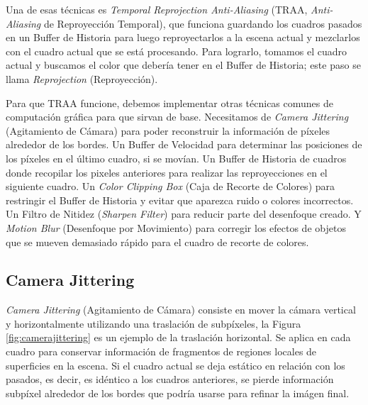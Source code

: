 \documentclass[pregrado]{tesis-usb} %
\begin{document}
Una de esas técnicas es \textit{Temporal Reprojection Anti-Aliasing}  (TRAA, \textit{Anti-Aliasing} de Reproyección Temporal), que funciona guardando los cuadros pasados en un Buffer de Historia para luego reproyectarlos a la escena actual y mezclarlos con el cuadro actual que se está procesando. Para lograrlo, tomamos el cuadro actual y buscamos el color que debería tener en el Buffer de Historia; este paso se llama \textit{Reprojection} (Reproyección).

Para que TRAA funcione, debemos implementar otras técnicas comunes de computación gráfica para que sirvan de base. Necesitamos de \textit{Camera Jittering} (Agitamiento de Cámara) para poder reconstruir la información de píxeles alrededor de los bordes. Un Buffer de Velocidad para determinar las posiciones de los píxeles en el último cuadro, si se movían. Un Buffer de Historia de cuadros donde recopilar los pixeles anteriores para realizar las reproyecciones en el siguiente cuadro. Un \textit{Color Clipping Box} (Caja de Recorte de Colores) para restringir el Buffer de Historia y evitar que aparezca ruido o colores incorrectos. Un Filtro de Nitidez (\textit{Sharpen Filter}) para reducir parte del desenfoque creado. Y \textit{Motion Blur} (Desenfoque por Movimiento) para corregir los efectos de objetos que se mueven demasiado rápido para el cuadro de recorte de colores.


\subsection{Camera Jittering}
\textit{Camera Jittering} (Agitamiento de Cámara) consiste en mover la cámara vertical y horizontalmente utilizando una traslación de subpíxeles, la Figura \ref{fig:camerajittering} es un ejemplo de la traslación horizontal. Se aplica en cada cuadro para conservar información de fragmentos de regiones locales de superficies en la escena. Si el cuadro actual se deja estático en relación con los pasados, es decir, es idéntico a los cuadros anteriores, se pierde información subpíxel alrededor de los bordes que podría usarse para refinar la imágen final.  ~\cite{Fuglsand2016, XU2016}
\end{document}
